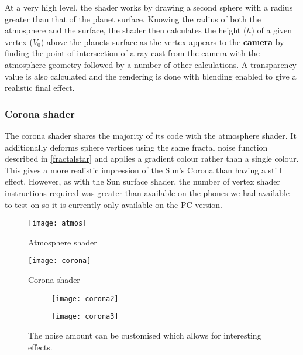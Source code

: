 At a very high level, the shader works by drawing a second sphere with a radius greater than that of the planet surface. Knowing the radius of both the atmosphere and the surface, the shader then calculates the height ($h$) of a given vertex ($V_0$) above the planets surface as the vertex appears to the \textbf{camera} by finding the point of intersection of a ray cast from the camera with the atmosphere geometry followed by a number of other calculations. A transparency value is also calculated and the rendering is done with blending enabled to give a realistic final effect.

\subsubsection{Corona shader}

The corona shader shares the majority of its code with the atmosphere shader. It additionally deforms sphere vertices using the same fractal noise function described in \cref{fractalstar} and applies a gradient colour rather than a single colour. This gives a more realistic impression of the Sun's Corona than having a still effect. However, as with the Sun surface shader, the number of vertex shader instructions required was greater than available on the phones we had available to test on so it is currently only available on the PC version.

\begin{figure}[!htbp]
\centering
\begin{minipage}{.5\textwidth}
  \centering
  \texttt{[image: atmos]}
  \caption{Atmosphere shader}
  \label{fig:atmos}
\end{minipage}%
\begin{minipage}{.5\textwidth}
  \centering
  \texttt{[image: corona]}
  \caption{Corona shader}
  \label{fig:corona}
\end{minipage}
\end{figure}

\begin{figure}[!htbp]
\centering
\begin{subfigure}{.5\textwidth}
  \centering
  \texttt{[image: corona2]}
  \label{fig:corona2}
\end{subfigure}%
\begin{subfigure}{.5\textwidth}
  \centering
  \texttt{[image: corona3]}
  \label{fig:corona3}
\end{subfigure}
\caption{The noise amount can be customised which allows for interesting effects.}
\label{fig:coronafull}
\end{figure}

